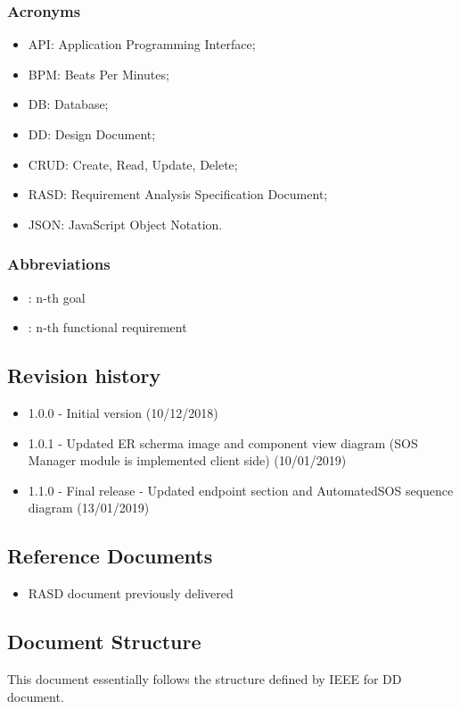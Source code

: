 \documentclass[DD.tex]{subfiles}
\begin{document}
\subsubsection{Acronyms}
\begin{itemize}
	\item API: Application Programming Interface;
	\item BPM: Beats Per Minutes;
	\item DB: Database;
	\item DD: Design Document;
	\item CRUD: Create, Read, Update, Delete;
	\item RASD: Requirement Analysis Specification Document;
	\item JSON: JavaScript Object Notation.
\end{itemize}

\subsubsection{Abbreviations}
\begin{itemize}
	\item \begin{math}[Gn]\end{math}: n-th goal
	\item \begin{math}[Rn]\end{math}: n-th functional requirement
\end{itemize}

\subsection{Revision history}
\begin{itemize}
		\item 1.0.0 - Initial version (10/12/2018)
		\item 1.0.1 - Updated ER scherma image and component view diagram (SOS Manager module is implemented client side) (10/01/2019)
		\item 1.1.0 - Final release - Updated endpoint section and AutomatedSOS sequence diagram (13/01/2019)
\end{itemize}

\subsection{Reference Documents} 
\begin{itemize}
		\item RASD document previously delivered 
\end{itemize}

\subsection{Document Structure}
This document essentially follows the structure defined by IEEE for DD document.

\newpage
\end{document}

